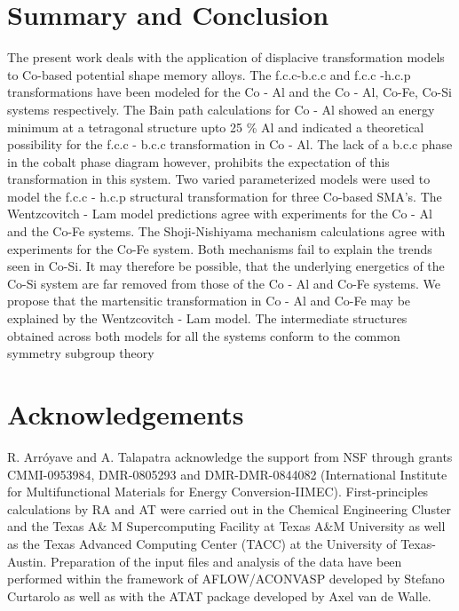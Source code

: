 \documentclass[preprint]{elsarticle}
\begin{document}
\section{Summary and Conclusion}
\label{Sec:summary}
The present work deals with the application of displacive transformation models to Co-based potential shape memory alloys. The f.c.c-b.c.c and f.c.c -h.c.p transformations have been modeled for the Co - Al and the Co - Al, Co-Fe, Co-Si systems respectively. The Bain path calculations for Co - Al showed an energy minimum at a
tetragonal structure upto 25 \% Al and indicated a theoretical possibility for the f.c.c - b.c.c transformation in Co - Al. The lack of a b.c.c phase in the cobalt phase diagram however, prohibits the expectation of this transformation in this system.
Two varied  parameterized models were used  to model the f.c.c - h.c.p
structural transformation for three Co-based SMA’s. The Wentzcovitch - Lam model predictions agree with experiments for the Co - Al and the Co-Fe systems. The Shoji-Nishiyama mechanism calculations agree with experiments for the  Co-Fe system. Both mechanisms fail to explain the trends seen in Co-Si. It may therefore be possible, that the underlying energetics of the Co-Si system are far removed from those of the Co - Al and Co-Fe systems. We propose that the martensitic transformation  in  Co - Al and Co-Fe may be explained by the Wentzcovitch - Lam  model. The intermediate structures obtained across both models for all the systems  conform to the common symmetry subgroup theory
\section{Acknowledgements}
\label{Sec:ack}
R. Arr\'{o}yave and A. Talapatra acknowledge the support from NSF through grants CMMI-0953984, DMR-0805293 and DMR-DMR-0844082 (International Institute for Multifunctional Materials for Energy Conversion-IIMEC). First-principles calculations by RA and AT were carried out in the Chemical Engineering Cluster and the Texas A\& M Supercomputing Facility at Texas A\&M University as well as the Texas Advanced Computing Center (TACC) at the University of Texas-Austin. Preparation of the input files and analysis of the data have been performed within the framework  of AFLOW/ACONVASP developed by Stefano Curtarolo as well as with the ATAT package developed by Axel van de Walle.
  

\end{document}
